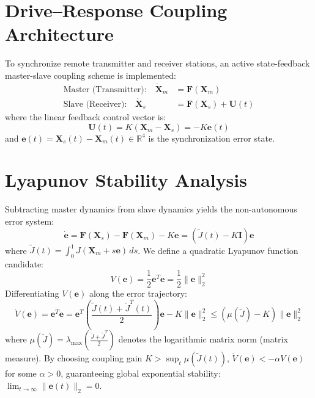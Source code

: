 \documentclass[12pt,a4paper,oneside]{report}
\begin{document}
\section{Drive--Response Coupling Architecture}
To synchronize remote transmitter and receiver stations, an active state-feedback master-slave coupling scheme is implemented:
\begin{align}
    \text{Master (Transmitter):} \quad \dot{\mathbf{X}}_m &= \mathbf{F}(\mathbf{X}_m) \\
    \text{Slave (Receiver):} \quad \dot{\mathbf{X}}_s &= \mathbf{F}(\mathbf{X}_s) + \mathbf{U}(t)
\end{align}
where the linear feedback control vector is:
\begin{equation}
    \mathbf{U}(t) = K (\mathbf{X}_m - \mathbf{X}_s) = -K \mathbf{e}(t)
\end{equation}
and $\mathbf{e}(t) = \mathbf{X}_s(t) - \mathbf{X}_m(t) \in \mathbb{R}^4$ is the synchronization error state.

\section{Lyapunov Stability Analysis}
Subtracting master dynamics from slave dynamics yields the non-autonomous error system:
\begin{equation}
    \dot{\mathbf{e}} = \mathbf{F}(\mathbf{X}_s) - \mathbf{F}(\mathbf{X}_m) - K \mathbf{e} = (\tilde{J}(t) - K \mathbf{I}) \mathbf{e}
\end{equation}
where $\tilde{J}(t) = \int_0^1 J(\mathbf{X}_m + s\mathbf{e}) \, ds$. We define a quadratic Lyapunov function candidate:
\begin{equation}
    V(\mathbf{e}) = \frac{1}{2} \mathbf{e}^T \mathbf{e} = \frac{1}{2} \|\mathbf{e}\|_2^2
\end{equation}
Differentiating $V(\mathbf{e})$ along the error trajectory:
\begin{equation}
    \dot{V}(\mathbf{e}) = \mathbf{e}^T \dot{\mathbf{e}} = \mathbf{e}^T \left( \frac{\tilde{J}(t) + \tilde{J}^T(t)}{2} \right) \mathbf{e} - K \|\mathbf{e}\|_2^2 \le (\mu(\tilde{J}) - K) \|\mathbf{e}\|_2^2
\end{equation}
where $\mu(\tilde{J}) = \lambda_{\max}\left(\frac{\tilde{J} + \tilde{J}^T}{2}\right)$ denotes the logarithmic matrix norm (matrix measure). By choosing coupling gain $K > \sup_{t} \mu(\tilde{J}(t))$, $\dot{V}(\mathbf{e}) < -\alpha V(\mathbf{e})$ for some $\alpha > 0$, guaranteeing global exponential stability: $\lim_{t \to \infty} \|\mathbf{e}(t)\|_2 = 0$.
\end{document}
